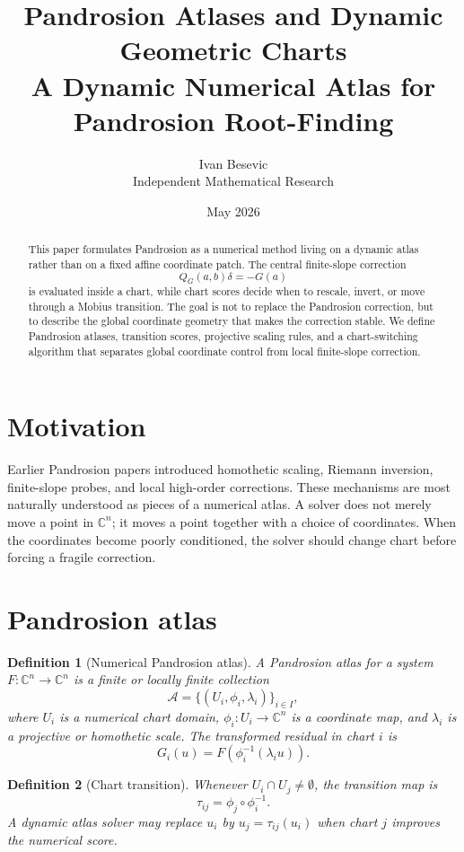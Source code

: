 \documentclass[11pt]{article}
\title{\textbf{Pandrosion Atlases and Dynamic Geometric Charts}\\[2mm]\large A Dynamic Numerical Atlas for Pandrosion Root-Finding}
\author{Ivan Besevic\\Independent Mathematical Research}
\date{May 2026}
\newtheorem{definition}{Definition}[section]
\newcommand{\C}{\mathbb C}
\begin{document}
\maketitle

\begin{abstract}
This paper formulates Pandrosion as a numerical method living on a dynamic atlas rather than on a fixed affine coordinate patch.  The central finite-slope correction
\[
        Q_G(a,b)\delta=-G(a)
\]
is evaluated inside a chart, while chart scores decide when to rescale, invert, or move through a Mobius transition.  The goal is not to replace the Pandrosion correction, but to describe the global coordinate geometry that makes the correction stable.  We define Pandrosion atlases, transition scores, projective scaling rules, and a chart-switching algorithm that separates global coordinate control from local finite-slope correction.
\end{abstract}

\section{Motivation}
Earlier Pandrosion papers introduced homothetic scaling, Riemann inversion, finite-slope probes, and local high-order corrections.  These mechanisms are most naturally understood as pieces of a numerical atlas.  A solver does not merely move a point in $\C^n$; it moves a point together with a choice of coordinates.  When the coordinates become poorly conditioned, the solver should change chart before forcing a fragile correction.

\section{Pandrosion atlas}
\begin{definition}[Numerical Pandrosion atlas]
A Pandrosion atlas for a system $F:\C^n\to\C^n$ is a finite or locally finite collection
\[
        \mathcal A=\{(U_i,\phi_i,\lambda_i)\}_{i\in I},
\]
where $U_i$ is a numerical chart domain, $\phi_i:U_i\to\C^n$ is a coordinate map, and $\lambda_i$ is a projective or homothetic scale.  The transformed residual in chart $i$ is
\[
        G_i(u)=F(\phi_i^{-1}(\lambda_i u)).
\]
\end{definition}

\begin{definition}[Chart transition]
Whenever $U_i\cap U_j\ne\emptyset$, the transition map is
\[
        \tau_{ij}=\phi_j\circ\phi_i^{-1}.
\]
A dynamic atlas solver may replace $u_i$ by $u_j=\tau_{ij}(u_i)$ when chart $j$ improves the numerical score.
\end{definition}
\end{document}
